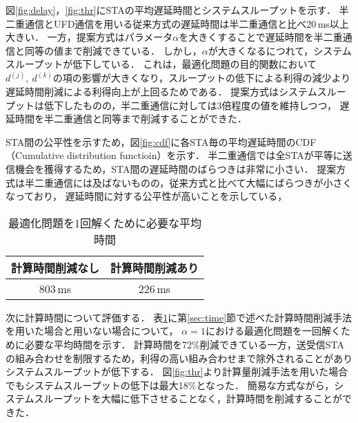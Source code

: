 \documentclass[technicalreport]{ieicej}
\begin{document}
		\par
		図\ref{fig:delay}，\ref{fig:thr}にSTAの平均遅延時間とシステムスループットを示す．
		半二重通信とUFD通信を用いる従来方式の遅延時間は半二重通信と比べ20\,ms以上大きい．
		一方，提案方式はパラメータ$\alpha$を大きくすることで遅延時間を半二重通信と同等の値まで削減できている．
		しかし，$\alpha$が大きくなるにつれて，システムスループットが低下している．
		これは，最適化問題の目的関数において$d^{(j)},\ d^{(k)}$の項の影響が大きくなり，スループットの低下による利得の減少より遅延時間削減による利得向上が上回るためである．
		提案方式はシステムスループットは低下したものの，半二重通信に対しては3倍程度の値を維持しつつ，
		遅延時間を半二重通信と同等まで削減することができた．
		\par
		STA間の公平性を示すため，図\ref{fig:cdf}に各STA毎の平均遅延時間のCDF（Cumulative distribution functioin）を示す．
		半二重通信では全STAが平等に送信機会を獲得するため，STA間の遅延時間のばらつきは非常に小さい．
		提案方式は半二重通信には及ばないものの，従来方式と比べて大幅にばらつきが小さくなっており，
		遅延時間に対する公平性が高いことを示している，

		\begin{table}[t]
			\centering
			\caption{最適化問題を1回解くために必要な平均時間}
			\label{tab:time}
			\begin{tabular}{cc}
			 計算時間削減なし & 計算時間削減あり\\ \hline
			 803\,ms & 226\,ms \\\hline
			\end{tabular}
		\end{table}

	\par
	次に計算時間について評価する．
	表\ref{tab:time}に第\ref{sec:time}節で述べた計算時間削減手法を用いた場合と用いない場合について，
	$\alpha=1$における最適化問題を一回解くために必要な平均時間を示す．
	計算時間を72\%削減できている一方，送受信STAの組み合わせを制限するため，利得の高い組み合わせまで除外されることがありシステムスループットが低下する．
	図\ref{fig:thr}より計算量削減手法を用いた場合でもシステムスループットの低下は最大18\%となった．
	簡易な方式ながら，システムスループットを大幅に低下させることなく，計算時間を削減することができた．
\end{document}
